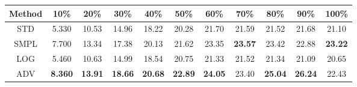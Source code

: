 \documentclass{standalone}
\begin{document}
\begin{tabular}{c|cccccccccc}
      \toprule
      Method & 10\% & 20\% & 30\% & 40\% & 50\% & 60\% & 70\% & 80\% & 90\% & 100\% \\
      \midrule
STD & 5.330 & 10.53 & 14.96 & 18.22 & 20.28 & 21.70 & 21.59 & 21.52 & 21.68 & 21.10\\
SMPL & 7.700 & 13.34 & 17.38 & 20.13 & 21.62 & 23.35 & \textbf{23.57} & 23.42 & 22.88 & \textbf{23.22}\\
LOG & 5.460 & 10.63 & 14.99 & 18.54 & 20.75 & 21.33 & 21.52 & 21.34 & 21.09 & 20.65\\
ADV & \textbf{8.360} & \textbf{13.91} & \textbf{18.66} & \textbf{20.68} & \textbf{22.89} & \textbf{24.05} & 23.40 & \textbf{25.04} & \textbf{26.24} & 22.43\\
  \bottomrule
\end{tabular}
\end{document}
